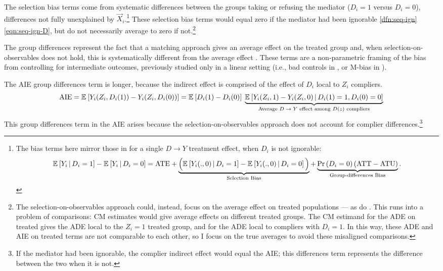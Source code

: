 The selection bias terms come from systematic differences between the groups taking or refusing the mediator ($D_i = 1$ versus $D_i = 0$), differences not fully unexplained by $\vec X_i$.\footnote{
    The bias terms here mirror those in \cite{heckman1998characterizing,angrist2009mostly} for a single $D\to Y$ treatment effect, when $D_i$ is not ignorable:
    \vspace{-0.25cm}
    \[ \mathbb{E}_{} \left[  Y_i \, \middle\vert \, D_i =1 \right] - \mathbb{E}_{} \left[  Y_i \, \middle\vert \, D_i =0 \right]
        = \text{ATE}
        + \underbrace{\Big( \mathbb{E}_{} \left[  Y_i(.,0) \, \middle\vert \, D_i =1 \right] - \mathbb{E}_{} \left[  Y_i(.,0) \, \middle\vert \, D_i =0 \right] \Big)}_{
            \text{Selection Bias}}
        + \underbrace{ \Pr\left( D_i=0 \right) (\text{ATT} - \text{ATU}) }_{
            \text{Group-differences Bias}}. \]
}
These selection bias terms would equal zero if the mediator had been ignorable \ref{dfn:seq-ign}\eqref{eqn:seq-ign-D}, but do not necessarily average to zero if not.\footnote{
    The selection-on-observables approach could, instead, focus on the average effect on treated populations --- as do \cite{keele2015identifying}.
    This runs into a problem of comparisons: CM estimates would give average effects on different treated groups.
    The CM estimand for the ADE on treated gives the ADE local to the $Z_i = 1$ treated group, and for the ADE local to compliers with $D_i = 1$.
    In this way, these ADE and AIE on treated terms are not comparable to each other, so I focus on the true averages to avoid these misaligned comparisons.
}

The group differences represent the fact that a matching approach gives an average effect on the treated group and, when selection-on-observables does not hold, this is systematically different from the average effect \citep{heckman1998characterizing}.
These terms are a non-parametric framing of the bias from controlling for intermediate outcomes, previously studied only in a linear setting (i.e., bad controls in \citealt{cinelli2024crash}, or M-bias in \citealt{ding2015adjust}).

The AIE group differences term is longer, because the indirect effect is comprised of the effect of $D_i$ local to $Z_i$ compliers.
\[ \text{AIE}
    = \mathbb{E}_{} \left[ Y_i(Z_i, D_i(1)) - Y_i(Z_i, D_i(0)) \right]
    = \mathbb{E}_{} \left[ D_i(1) - D_i(0) \right] \; 
        \underbrace{\mathbb{E}_{} \left[ Y_i(Z_i, 1) - Y_i(Z_i, 0) \, \middle\vert \, D_i(1)=1, D_i(0)=0 \right]}_{
            \text{Average $D \to Y$ effect among $D(z)$ compliers}
        } \]
This group differences term in the AIE arises because the selection-on-observables approach does not account for complier differences.\footnote{
    If the mediator had been ignorable, the complier indirect effect would equal the AIE; this differences term represents the difference between the two when it is not.
}
